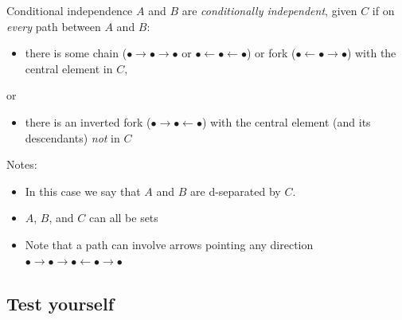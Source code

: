 \documentclass[
  11pt,
  ignorenonframetext,
]{beamer}
\providecommand{\tightlist}{%
  \setlength{\itemsep}{0pt}\setlength{\parskip}{0pt}}\usepackage{longtable,booktabs,array}
\begin{document}
\begin{frame}{Conditional independence}
\(A\) and \(B\) are \emph{conditionally independent}, given \(C\) if on
\emph{every} path between \(A\) and \(B\):

\begin{itemize}
\tightlist
\item
  there is some chain (\(\bullet\rightarrow \bullet\rightarrow\bullet\)
  or \(\bullet\leftarrow \bullet\leftarrow\bullet\)) or fork
  (\(\bullet\leftarrow \bullet\rightarrow\bullet\)) with the central
  element in \(C\),
\end{itemize}

or

\begin{itemize}
\tightlist
\item
  there is an inverted fork
  (\(\bullet\rightarrow \bullet\leftarrow\bullet\)) with the central
  element (and its descendants) \emph{not} in \(C\)
\end{itemize}

Notes:

\begin{itemize}
\tightlist
\item
  In this case we say that \(A\) and \(B\) are d-separated by \(C\).
\item
  \(A\), \(B\), and \(C\) can all be sets
\item
  Note that a path can involve arrows pointing any direction
  \(\bullet\rightarrow \bullet\rightarrow \bullet\leftarrow \bullet\rightarrow\bullet\)
\end{itemize}
\end{frame}

\hypertarget{test-yourself}{%
\subsection{Test yourself}\label{test-yourself}}
\end{document}
